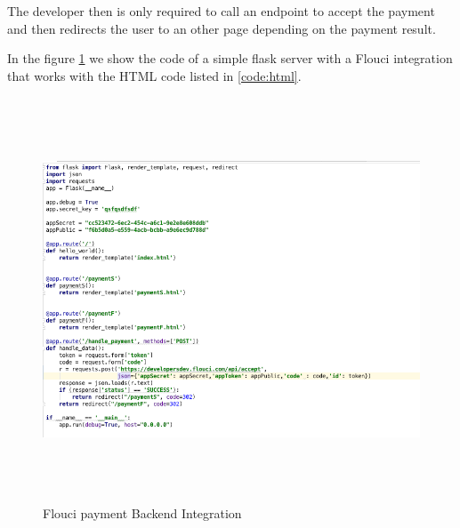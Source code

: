 \begin{spacing}{1.2}
The developer then is only required to call an endpoint to accept the payment and then redirects the user to an other page depending on the payment result. 

In the figure \ref{fig:flask} we show the code of a simple flask server with a Flouci integration that works with the HTML code listed in \ref{code:html}.
\begin{figure}[H]\centering
\includegraphics[width=\textwidth,height=12cm]{flask.png}
\caption{Flouci payment Backend Integration}
\label{fig:flask}
\end{figure}

\end{spacing}
